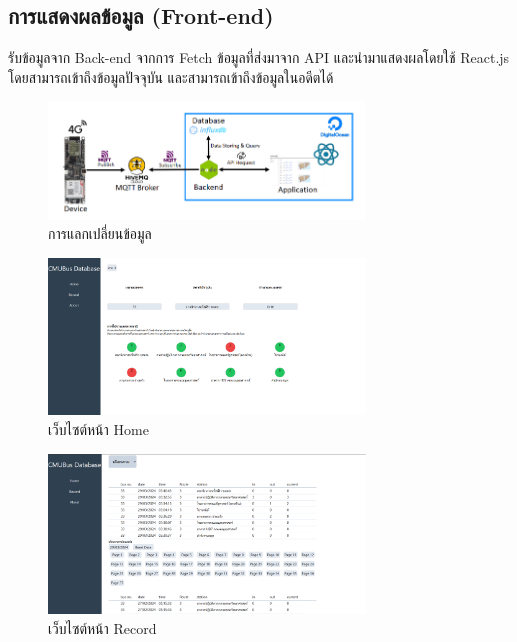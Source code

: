 \subsection{การแสดงผลข้อมูล (Front-end)}
รับข้อมูลจาก Back-end จากการ Fetch ข้อมูลที่ส่งมาจาก API และนำมาแสดงผลโดยใช้ React.js โดยสามารถเข้าถึงข้อมูลปัจจุบัน และสามารถเข้าถึงข้อมูลในอดีตได้

\begin{figure}[h!]
    \begin{center}
      \includegraphics[width=0.75\textwidth]{exchange-data.png}
    \end{center}
    \caption[Poem]{การแลกเปลี่ยนข้อมูล}
    \label{fig:exchangedata}
  \end{figure}

  \begin{figure}[h!]
    \begin{center}
      \includegraphics[width=0.75\textwidth]{home.png}
    \end{center}
    \caption[Poem]{เว็บไซต์หน้า Home}
    \label{fig:home}
  \end{figure}

  \begin{figure}[h!]
    \begin{center}
      \includegraphics[width=0.75\textwidth]{record.png}
    \end{center}
    \caption[Poem]{เว็บไซต์หน้า Record}
    \label{fig:record}
  \end{figure}

